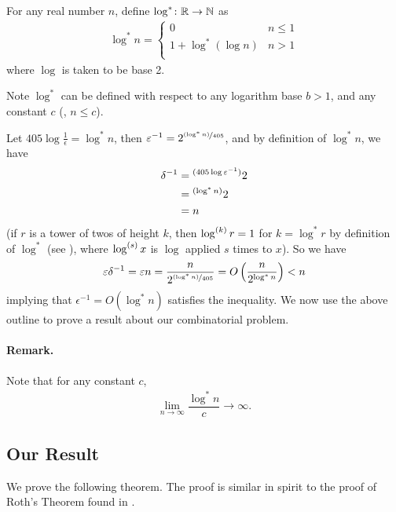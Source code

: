 \begin{definition}[$\log^* n$]\label{def:logstar}
	For any real number $n$, define $\log^*\colon \bbR \rightarrow \bbN$ as
	\begin{align*}
	\log^*n = \begin{cases}
	0 & n \leq 1\\
	1 + \log^* (\log n) & n > 1\\
	\end{cases}
	\end{align*}
	where $\log$ is taken to be base 2.
\end{definition}

\noindent Note $\log^*$ can be defined with respect to any logarithm base $b > 1$, and any constant $c$ (\ie, $n \leq c$).

Let $405\log \frac{1}{\epsilon} = \log^* n$, then $\epsilon^{-1} = 2^{\nicefrac{(\log^* n)}{405}}$, and by definition of $\log^* n$, we have 
\begin{align*}
	\delta^{-1} &= \prescript{(405\log\epsilon^{-1})}{}{2}\\
	&=\prescript{(\log^* n)}{}{2}\\
	&= n
\end{align*}
(if $r$ is a tower of twos of height $k$, then $\log\p{k} r = 1$ for $k = \log^* r$ by definition of $\log^*$ (see ), where $\log\p{s} x$ is $\log$ applied $s$ times to $x$). So we have
\begin{align*}
\epsilon \delta^{-1} = \epsilon n = \dfrac{n}{2^{\nicefrac{(\log^* n)}{405}}} = O\left(\dfrac{n}{2^{\log^* n}}\right) < n
\end{align*}
implying that $\epsilon^{-1} = O\left(\log^* n\right)$ satisfies the inequality. We now use the above outline to prove a result about our combinatorial problem.

\paragraph{Remark.} Note that for any constant $c$,
\begin{align*}
	\lim_{n \to \infty} \dfrac{\log^* n}{c} \to \infty.
\end{align*}

\subsection{Our Result}

We prove the following theorem. The proof is similar in spirit to the proof of Roth's Theorem found in \cite{Verstraete}.

